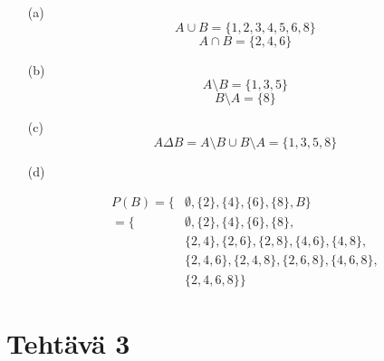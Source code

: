 \documentclass{article}
\begin{document}
\begin{enumerate}

	\item[(a)]
	\[
	A \cup B = \{1, 2, 3, 4, 5, 6, 8\}
	\]
	\[
	A \cap B = \{2, 4, 6\}
	\]

	\item[(b)]
	\[
	A \setminus B = \{ 1, 3, 5\}
	\]
	\[
	B \setminus A = \{ 8\}
	\]

	\item[(c)]
	\[
	A \Delta B = A \setminus B \cup B \setminus A = \{1, 3, 5, 8\}
	\]
	
	\item[(d)]
		
	\[
	\begin{aligned}
	P(B) = \{ &\emptyset, \{2\}, \{4\}, \{6\}, \{8\}, B\} \\
	= \{ 
		&\emptyset, \{ 2 \}, \{ 4 \}, \{ 6 \}, \{ 8 \}, \\
		&\{ 2, 4 \}, \{ 2, 6 \}, \{ 2, 8 \}, \{ 4, 6 \}, \{ 4, 8 \}, \\
		&\{ 2, 4, 6 \}, \{ 2, 4, 8 \}, \{ 2, 6, 8 \}, \{ 4, 6, 8 \}, \\
		&\{ 2, 4, 6, 8 \}
	  \}
	\end{aligned}
	\]
		
\end{enumerate}


\newpage

\section*{Tehtävä 3}
\end{document}

